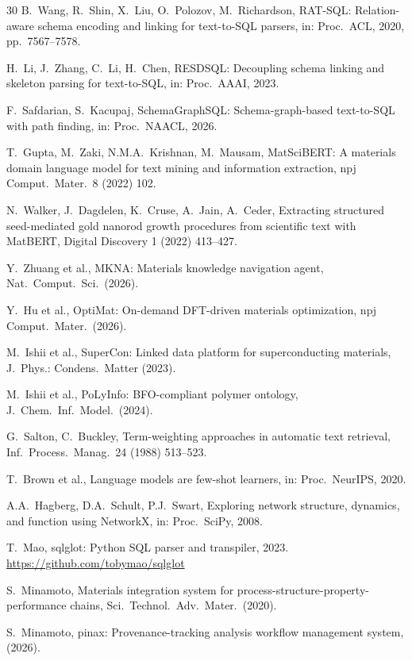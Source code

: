 \documentclass[5p,twocolumn]{elsarticle}
\begin{document}
\begin{thebibliography}{30}
B.~Wang, R.~Shin, X.~Liu, O.~Polozov, M.~Richardson,
RAT-SQL: Relation-aware schema encoding and linking for text-to-SQL parsers,
in: Proc.\ ACL, 2020, pp.~7567--7578.

H.~Li, J.~Zhang, C.~Li, H.~Chen,
RESDSQL: Decoupling schema linking and skeleton parsing for text-to-SQL,
in: Proc.\ AAAI, 2023.

F.~Safdarian, S.~Kacupaj,
SchemaGraphSQL: Schema-graph-based text-to-SQL with path finding,
in: Proc.\ NAACL, 2026.

T.~Gupta, M.~Zaki, N.M.A.~Krishnan, M.~Mausam,
MatSciBERT: A materials domain language model for text mining and information extraction,
npj Comput.\ Mater.\ 8 (2022) 102.

N.~Walker, J.~Dagdelen, K.~Cruse, A.~Jain, A.~Ceder,
Extracting structured seed-mediated gold nanorod growth procedures from scientific text with MatBERT,
Digital Discovery 1 (2022) 413--427.

Y.~Zhuang et al.,
MKNA: Materials knowledge navigation agent,
Nat.\ Comput.\ Sci.\ (2026).

Y.~Hu et al.,
OptiMat: On-demand DFT-driven materials optimization,
npj Comput.\ Mater.\ (2026).

M.~Ishii et al.,
SuperCon: Linked data platform for superconducting materials,
J.\ Phys.: Condens.\ Matter (2023).

M.~Ishii et al.,
PoLyInfo: BFO-compliant polymer ontology,
J.\ Chem.\ Inf.\ Model.\ (2024).

G.~Salton, C.~Buckley,
Term-weighting approaches in automatic text retrieval,
Inf.\ Process.\ Manag.\ 24 (1988) 513--523.

T.~Brown et al.,
Language models are few-shot learners,
in: Proc.\ NeurIPS, 2020.

A.A.~Hagberg, D.A.~Schult, P.J.~Swart,
Exploring network structure, dynamics, and function using {NetworkX},
in: Proc.\ SciPy, 2008.

T.~Mao,
sqlglot: Python SQL parser and transpiler, 2023.
\url{https://github.com/tobymao/sqlglot}

S.~Minamoto,
Materials integration system for process-structure-property-performance chains,
Sci.\ Technol.\ Adv.\ Mater.\ (2020).

S.~Minamoto,
pinax: Provenance-tracking analysis workflow management system,
(2026).

\end{thebibliography}
\end{document}
